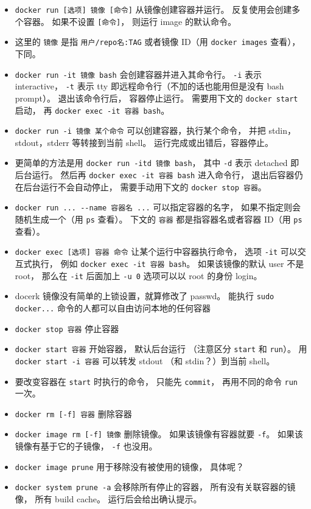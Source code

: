 \begin{itemize}
\item \verb`docker run [选项] 镜像 [命令]` 从镜像创建容器并运行。 反复使用会创建多个容器。 如果不设置 \verb`[命令]`， 则运行 image 的默认命令。
\item 这里的 \verb`镜像` 是指 \verb`用户/repo名:TAG` 或者镜像 ID（用 \verb`docker images` 查看）， 下同。
\item \verb`docker run -it 镜像 bash` 会创建容器并进入其命令行。 \verb`-i` 表示 interactive， \verb`-t` 表示 tty 即远程命令行（不加的话也能用但是没有 bash prompt）。 退出该命令行后， 容器停止运行。 需要用下文的 \verb`docker start` 启动， 再 \verb`docker exec -it 容器 bash`。
\item \verb`docker run -i 镜像 某个命令` 可以创建容器，执行某个命令， 并把 stdin，stdout，stderr 等转接到当前 shell。 运行完成或出错后，容器停止。
\item 更简单的方法是用 \verb`docker run -itd 镜像 bash`， 其中 \verb`-d` 表示 detached 即后台运行。 然后再 \verb`docker exec -it 容器 bash` 进入命令行， 退出后容器仍在后台运行不会自动停止， 需要手动用下文的 \verb`docker stop 容器`。
\item \verb`docker run ... --name 容器名 ...` 可以指定容器的名字， 如果不指定则会随机生成一个（用 \verb`ps` 查看）。 下文的 \verb`容器` 都是指容器名或者容器 ID（用 \verb`ps` 查看）。
\item \verb`docker exec [选项] 容器 命令` 让某个运行中容器执行命令， 选项 \verb`-it` 可以交互式执行， 例如 \verb`docker exec -it 容器 bash`。 如果该镜像的默认 user 不是 root， 那么在 \verb`-it` 后面加上 \verb`-u 0` 选项可以以 root 的身份 login。
\item docerk 镜像没有简单的上锁设置，就算修改了 passwd。 能执行 \verb`sudo docker...` 命令的人都可以自由访问本地的任何容器
\item \verb`docker stop 容器` 停止容器
\item \verb`docker start 容器` 开始容器， 默认后台运行 （注意区分 \verb`start` 和 \verb`run`）。 用 \verb`docker start -i 容器` 可以转发 stdout （和 stdin？）到当前 shell。
\item 要改变容器在 \verb`start` 时执行的命令， 只能先 \verb`commit`， 再用不同的命令 \verb`run` 一次。
\item \verb`docker rm [-f] 容器` 删除容器
\item \verb`docker image rm [-f] 镜像` 删除镜像。 如果该镜像有容器就要 \verb`-f`。 如果该镜像有基于它的子镜像， \verb`-f` 也没用。
\item \verb`docker image prune` 用于移除没有被使用的镜像， 具体呢？
\item \verb`docker system prune -a` 会移除所有停止的容器， 所有没有关联容器的镜像， 所有 build cache。 运行后会给出确认提示。

\end{itemize}
